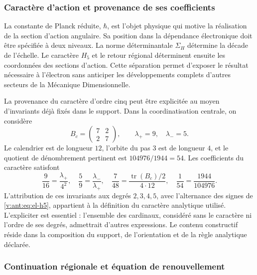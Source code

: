 \subsubsection{Caractère d'action et provenance de ses coefficients}
\label{v:ant:sec:revision-planck}

La constante de Planck réduite, \(\hbar\), est l'objet physique qui
motive la réalisation de la section d'action angulaire. Sa position dans
la dépendance électronique doit être spécifiée à deux niveaux. La norme
déterminantale \(\Sigma_H\) détermine la décade de l'échelle. Le caractère
\(H_5\) et le retour régional déterminent ensuite les coordonnées des
sections d'action. Cette séparation permet d'exposer le résultat
nécessaire à l'électron sans anticiper les développements complets
d'autres secteurs de la Mécanique Dimensionnelle.

La provenance du caractère d'ordre cinq peut être explicitée au moyen
d'invariants déjà fixés dans le support. Dans la coordinatisation centrale, on considère
\[
 B_c=\begin{pmatrix}7&2\\2&7\end{pmatrix},
 \qquad \lambda_+=9,\quad\lambda_-=5.
\]
Le calendrier est de longueur \(12\), l'orbite du pas \(3\) est de
longueur \(4\), et le quotient de dénombrement pertinent est
\(104976/1944=54\). Les coefficients du caractère satisfont
\begin{equation}
 \frac9{16}=\frac{\lambda_+}{4^2},\quad
 \frac59=\frac{\lambda_-}{\lambda_+},\quad
 \frac7{48}=\frac{\operatorname{tr}(B_c)/2}{4\cdot12},\quad
 \frac1{54}=\frac{1944}{104976}.
 \label{v:ant:eq:revision-h5-coeficientes}
\end{equation}
L'attribution de ces invariants aux degrés \(2,3,4,5\), avec
l'alternance des signes de \eqref{v:ant:eq:el-h5}, appartient à la définition du
caractère analytique utilisé. L'expliciter est essentiel : l'ensemble des
cardinaux, considéré sans le caractère ni l'ordre de ses degrés,
admettrait d'autres expressions. Le contenu constructif réside dans la
composition du support, de l'orientation et de la règle analytique déclarée.

\subsubsection{Continuation régionale et équation de renouvellement}


